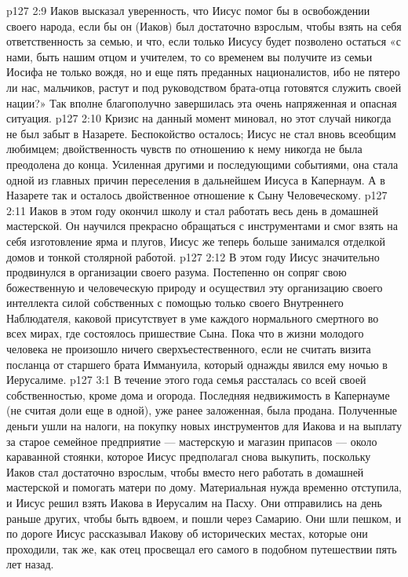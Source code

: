\vs p127 2:9 Иаков высказал уверенность, что Иисус помог бы в освобождении своего народа, если бы он (Иаков) был достаточно взрослым, чтобы взять на себя ответственность за семью, и что, если только Иисусу будет позволено остаться «с нами, быть нашим отцом и учителем, то со временем вы получите из семьи Иосифа не только вождя, но и еще пять преданных националистов, ибо не пятеро ли нас, мальчиков, растут и под руководством брата\hyp{}отца готовятся служить своей нации?» Так вполне благополучно завершилась эта очень напряженная и опасная ситуация.
\vs p127 2:10 Кризис на данный момент миновал, но этот случай никогда не был забыт в Назарете. Беспокойство осталось; Иисус не стал вновь всеобщим любимцем; двойственность чувств по отношению к нему никогда не была преодолена до конца. Усиленная другими и последующими событиями, она стала одной из главных причин переселения в дальнейшем Иисуса в Капернаум. А в Назарете так и осталось двойственное отношение к Сыну Человеческому.
\vs p127 2:11 \pc Иаков в этом году окончил школу и стал работать весь день в домашней мастерской. Он научился прекрасно обращаться с инструментами и смог взять на себя изготовление ярма и плугов, Иисус же теперь больше занимался отделкой домов и тонкой столярной работой.
\vs p127 2:12 \pc В этом году Иисус значительно продвинулся в организации своего разума. Постепенно он сопряг свою божественную и человеческую природу и осуществил эту организацию своего интеллекта силой собственных  с помощью только своего Внутреннего Наблюдателя, каковой присутствует в уме каждого нормального смертного во всех мирах, где состоялось пришествие Сына. Пока что в жизни молодого человека не произошло ничего сверхъестественного, если не считать визита посланца от старшего брата Иммануила, который однажды явился ему ночью в Иерусалиме.
\vs p127 3:1 В течение этого года семья рассталась со всей своей собственностью, кроме дома и огорода. Последняя недвижимость в Капернауме (не считая доли еще в одной), уже ранее заложенная, была продана. Полученные деньги ушли на налоги, на покупку новых инструментов для Иакова и на выплату за старое семейное предприятие --- мастерскую и магазин припасов --- около караванной стоянки, которое Иисус предполагал снова выкупить, поскольку Иаков стал достаточно взрослым, чтобы вместо него работать в домашней мастерской и помогать матери по дому. Материальная нужда временно отступила, и Иисус решил взять Иакова в Иерусалим на Пасху. Они отправились на день раньше других, чтобы быть вдвоем, и пошли через Самарию. Они шли пешком, и по дороге Иисус рассказывал Иакову об исторических местах, которые они проходили, так же, как отец просвещал его самого в подобном путешествии пять лет назад.
